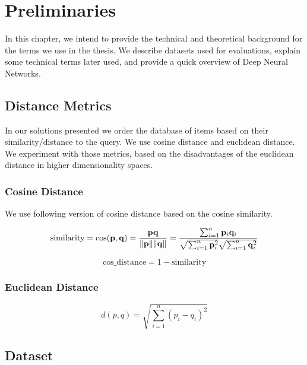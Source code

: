 

\chapter{Preliminaries}

In this chapter, we intend to provide the technical and theoretical background for the terms we use in the thesis. We describe datasets used for evaluations, explain some technical terms later used, and provide a quick overview of Deep Neural Networks.

\section{Distance Metrics}

In our solutions presented we order the database of items based on their similarity/distance to the query. We use cosine distance and euclidean distance. We experiment with those metrics, based on the disadvantages of the euclidean distance in higher dimensionality spaces.

\subsection{Cosine Distance}

We use following version of cosine distance based on the cosine similarity.

\begin{equation}
\text{similarity} = \cos ({\bf p},{\bf q})= {{\bf p} {\bf q} \over \|{\bf p}\| \|{\bf q}\|} = \frac{ \sum_{i=1}^{n}{{\bf p}_i{\bf q}_i} }{ \sqrt{\sum_{i=1}^{n}{{\bf p}_i^2}} \sqrt{\sum_{i=1}^{n}{{\bf q}_i^2}} }
\end{equation}

\begin{equation}
    \text{cos\_distance} = 1 - \text{similarity}
\end{equation}

\subsection{Euclidean Distance}
\begin{equation}
d(p, q) = \sqrt{\sum_{i=1}^n (p_i - q_i)^2}    
\end{equation}

\section{Dataset}

